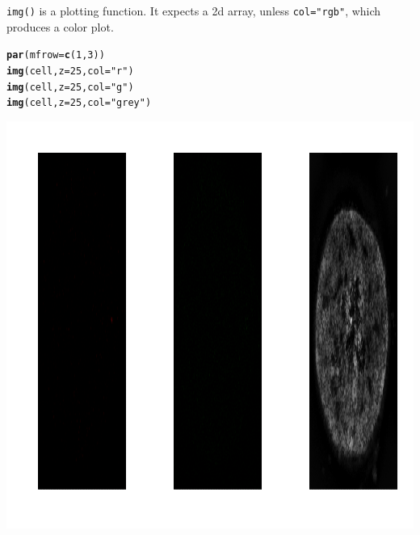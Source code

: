 \documentclass{article}\usepackage[]{graphicx}\usepackage[]{color}
\makeatletter
\def\maxwidth{ %
  \ifdim\Gin@nat@width>\linewidth
    \linewidth
  \else
    \Gin@nat@width
  \fi
}
\newcommand{\hlnum}[1]{\textcolor[rgb]{0.686,0.059,0.569}{#1}}%
\newcommand{\hlstr}[1]{\textcolor[rgb]{0.192,0.494,0.8}{#1}}%
\newcommand{\hlstd}[1]{\textcolor[rgb]{0.345,0.345,0.345}{#1}}%
\newcommand{\hlkwc}[1]{\textcolor[rgb]{0.333,0.667,0.333}{#1}}%
\newcommand{\hlkwd}[1]{\textcolor[rgb]{0.737,0.353,0.396}{\textbf{#1}}}%
\newenvironment{kframe}{%
 \def\at@end@of@kframe{}%
 \ifinner\ifhmode%
  \def\at@end@of@kframe{\end{minipage}}%
  \begin{minipage}{\columnwidth}%
 \fi\fi%
 \def\FrameCommand##1{\hskip\@totalleftmargin \hskip-\fboxsep
 \colorbox{shadecolor}{##1}\hskip-\fboxsep
     \hskip-\linewidth \hskip-\@totalleftmargin \hskip\columnwidth}%
 \MakeFramed {\advance\hsize-\width
   \@totalleftmargin\z@ \linewidth\hsize
   \@setminipage}}%
 {\par\unskip\endMakeFramed%
 \at@end@of@kframe}
\newenvironment{knitrout}{}{} %
\makeatother
\begin{document}
\texttt{img()} is a plotting function. It expects a 2d array, unless \texttt{col="rgb"}, which produces a color plot. 
\begin{knitrout}
\color{fgcolor}\begin{kframe}
\begin{alltt}
\hlkwd{par}\hlstd{(}\hlkwc{mfrow}\hlstd{=}\hlkwd{c}\hlstd{(}\hlnum{1}\hlstd{,}\hlnum{3}\hlstd{))}
\hlkwd{img}\hlstd{(cell,} \hlkwc{z}\hlstd{=}\hlnum{25}\hlstd{,} \hlkwc{col}\hlstd{=}\hlstr{"r"}\hlstd{)}
\hlkwd{img}\hlstd{(cell,} \hlkwc{z}\hlstd{=}\hlnum{25}\hlstd{,} \hlkwc{col}\hlstd{=}\hlstr{"g"}\hlstd{)}
\hlkwd{img}\hlstd{(cell,} \hlkwc{z}\hlstd{=}\hlnum{25}\hlstd{,} \hlkwc{col}\hlstd{=}\hlstr{"grey"}\hlstd{)}
\end{alltt}
\end{kframe}
\includegraphics[width=\maxwidth]{figure/unnamed-chunk-3-1} 

\end{knitrout}
\end{document}
